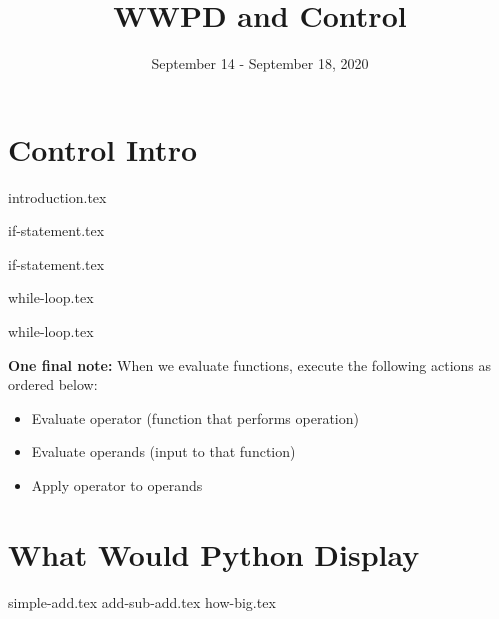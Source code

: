 \documentclass{exam}
\title{WWPD and Control}
\date{September 14 - September 18, 2020}
\begin{document}
\maketitle
\section{Control Intro}
{introduction.tex}


{if-statement.tex}

{if-statement.tex}

{while-loop.tex}

{while-loop.tex}

\vspace{5}                                                                                                                                                                                                                                                                                                                                                                                                                                                                                                                                                                                                                                                                                                                                                                                                                                                                                                                                                                              
\textbf{One final note: } When we evaluate functions, execute the following actions as ordered below:
\begin{itemize}
  \item Evaluate operator (function that performs operation)
  \item Evaluate operands (input to that function)
  \item Apply operator to operands
\end{itemize}


\section{What Would Python Display}
\begin{questions}
{simple-add.tex}
{add-sub-add.tex}
{how-big.tex}

\end{questions}
\newpage
\end{document}
